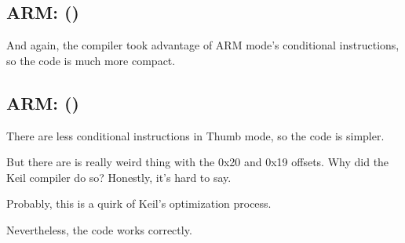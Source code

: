 ﻿\subsection{ARM: \OptimizingKeilVI (\ARMMode)}

And again, the compiler took advantage of ARM mode's conditional instructions, 
so the code is much more compact.



\subsection{ARM: \OptimizingKeilVI (\ThumbMode)}
\myindex{\CompilerAnomaly}
\label{Keil_anomaly}

There are less conditional instructions in Thumb mode, so the code is simpler.

But there are is really weird thing with the 0x20 and 0x19 offsets.
Why did the Keil compiler do so?
Honestly, it's hard to say.

Probably, this is a quirk of Keil's optimization process.

Nevertheless, the code works correctly.



